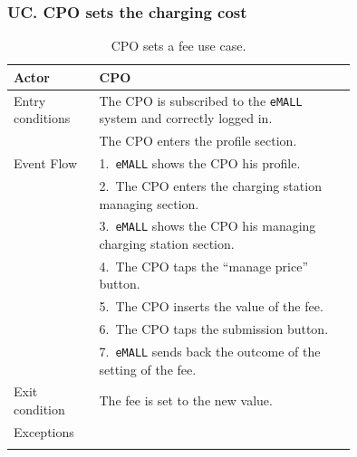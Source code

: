 \subsubsection*{UC\cuc . CPO sets the charging cost}
\begin{center}
    \begin{longtable}{lp{0.75\linewidth}}
        \hline
        Actor            & CPO                                                                \\
        \hline
        Entry conditions & The CPO is subscribed to the \verb|eMALL| system and correctly logged in. \\
        & The CPO enters the profile section.                                \\
        \hline
        Event Flow       & 1.\ \verb|eMALL| shows the CPO his profile.                               \\
        & 2.\ The CPO enters the charging station managing section.          \\
        & 3.\ \verb|eMALL| shows the CPO his managing charging station section.     \\
        & 4.\ The CPO taps the ``manage price'' button.                      \\
        & 5.\ The CPO inserts the value of the fee.                          \\
        & 6.\ The CPO taps the submission button.                            \\
        & 7.\ \verb|eMALL| sends back the outcome of the setting of the fee.        \\
        \hline
        Exit condition   & The fee is set to the new value.                                   \\
        \hline
        Exceptions       &                                                                    \\
        \hline
        \caption{CPO sets a fee use case.}
        \label{tab: CPO_sets_fee_use_case}
    \end{longtable}


\end{center}
